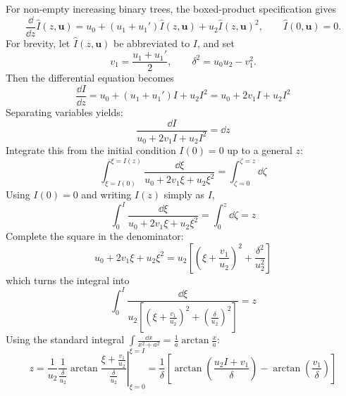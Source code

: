 
For non-empty increasing binary trees, the boxed-product specification gives
\begin{equation*}
    \frac{\dd}{\dd z}\hat{I}(z,\mathbf{u})
        = u_0 + (u_1+u_1')\hat{I}(z,\mathbf{u}) + u_2\hat{I}(z,\mathbf{u})^2,
        \qquad \hat{I}(0,\mathbf{u})=0.
\end{equation*}
For brevity, let $\hat{I}(z, \mathbf{u})$ be abbreviated to $I$, and set
\begin{equation*}
    v_1=\frac{u_1+u_1'}{2}, \qquad \delta^2=u_0u_2-v_1^2.
\end{equation*}
Then the differential equation becomes
\begin{equation*}
    \frac{\dd I}{\dd z} = u_{0} + (u_{1} + u_{1}')I + u_{2}I^{2} = u_{0} + 2v_{1}I + u_{2}I^{2}
\end{equation*}
Separating variables yields:
\begin{equation*}
    \frac{\dd I}{u_{0} + 2v_{1}I + u_{2}I^{2}} = \dd z
\end{equation*}
Integrate this from the initial condition $I(0) = 0$ up to a general $z$:
\begin{equation*}
    \int_{\xi = I(0)}^{\xi = I(z)} \frac{\dd \xi}{u_{0} + 2v_{1}\xi + u_{2}\xi^{2}} = \int_{\zeta = 0}^{\zeta = z} \dd \zeta
\end{equation*}
Using $I(0) = 0$ and writing $I(z)$ simply as $I$,
\begin{equation*}
    \int_{0}^{I} \frac{\dd \xi}{u_{0} + 2v_{1}\xi + u_{2}\xi^{2}} = \int_{0}^{z} \dd \zeta = z
\end{equation*}
Complete the square in the denominator:
\begin{equation*}
    u_{0} + 2v_{1}\xi + u_{2}\xi^{2}
    = u_{2}\left[\left(\xi + \frac{v_{1}}{u_{2}}\right)^{2} + \frac{\delta^{2}}{u_{2}^{2}}\right]
\end{equation*}
which turns the integral into
\begin{equation*}
    \int_{0}^{I} \frac{\dd \xi}{u_{2}\left[\left(\xi + \frac{v_{1}}{u_{2}}\right)^{2} + \left(\frac{\delta}{u_{2}}\right)^{2}\right]} = z
\end{equation*}
Using the standard integral $\int \frac{\dd x}{x^{2} +a^{2}} = \frac{1}{a} \arctan \frac{x}{a}$:
\begin{equation*}
    z = \frac{1}{u_{2}} \frac{1}{\frac{\delta}{u_{2}}}
        \arctan\left.\frac{\xi + \frac{v_{1}}{u_{2}}}{\frac{\delta}{u_{2}}}\right|_{\xi = 0}^{\xi = I}
      = \frac{1}{\delta} \left[
            \arctan\left(\frac{u_{2}I + v_{1}}{\delta}\right) - \arctan\left(\frac{v_{1}}{\delta}\right)
        \right]
\end{equation*}
